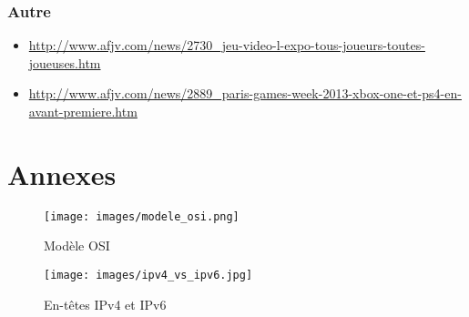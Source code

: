 \documentclass[french]{article}
\begin{document}
\subsubsection*{Autre}
\begin{itemize}
\item \url{http://www.afjv.com/news/2730_jeu-video-l-expo-tous-joueurs-toutes-joueuses.htm}
\item \url{http://www.afjv.com/news/2889_paris-games-week-2013-xbox-one-et-ps4-en-avant-premiere.htm}
\end{itemize}


\newpage
\section{Annexes}

\hypertarget{modele_osi}{}
\begin{figure}[h]
	\texttt{[image: images/modele\_osi.png]}
	\caption{Modèle OSI}
	\label{fig:Modèle OSI}
\end{figure} 

\hypertarget{ipv4_vs_ipv6}{}
\begin{figure}[h]
	\texttt{[image: images/ipv4\_vs\_ipv6.jpg]}
	\caption{En-têtes IPv4 et IPv6}
	\label{fig:En-têtes IPv4 et IPv6}
\end{figure} 

\begin{comment}
\section {Remerciements}

\begin{itemize}
\item Yann Mahé, professeur au département ETN, pour nous avoir aidé à trouver une solution de mesures électriques pour la Nantarena 13.3 et nous avoir prêté les deux watt-mètre à effet Hall.
\item David Tollec, étudiant en INFO3, pour avoir réalisé la planche électrique qui a permis les mesures électriques lors de la Nantarena 13.3.
\end{itemize}

\end{comment}
\end{document}
